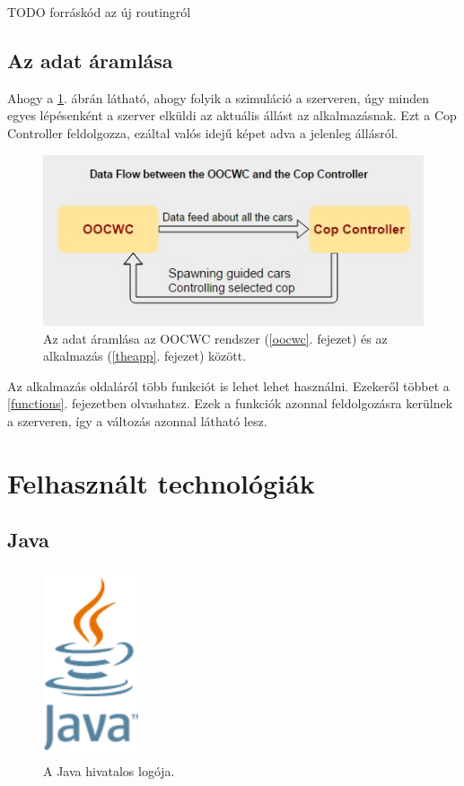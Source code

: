 \documentclass[a4paper,12pt]{report}
\begin{document}
TODO forráskód az új routingról

\section{Az adat áramlása}
\label{dataflow}

Ahogy a \ref{dataflowpicture}. ábrán látható, ahogy folyik a szimuláció a szerveren, úgy minden egyes lépésenként a szerver elküldi az aktuális állást az alkalmazásnak. Ezt a Cop Controller feldolgozza, ezáltal valós idejű képet adva a jelenleg állásról.

\begin{figure}[h]
\centerline{
\includegraphics[width=4.5in]{img/dataflow}}
\caption{Az adat áramlása az OOCWC rendszer (\ref{oocwc}. fejezet) és az alkalmazás (\ref{theapp}. fejezet) között.}
\label{dataflowpicture}
\end{figure}

\vspace{2mm}
Az alkalmazás oldaláról több funkciót is lehet lehet használni. Ezekeről többet a \ref{functions}. fejezetben olvashatsz. Ezek a funkciók azonnal feldolgozásra kerülnek a szerveren, így a változás azonnal látható lesz.

\newpage
\chapter{Felhasznált technológiák}
\label{technologies}

\section{Java}
\label{java}

\begin{figure}
\centerline{
\includegraphics[width=1.1in]{img/javalogo}}
\caption{A Java hivatalos logója.}
\label{javalogo}
\end{figure}
\end{document}
